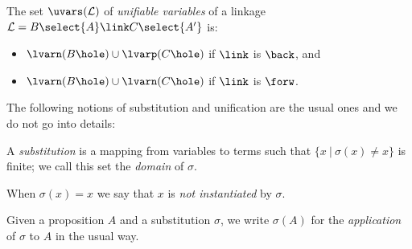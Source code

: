 \begin{definition}
\end{definition}


\begin{definition}\label{def:uvars}
  The set $\uvars(\mathcal{L})$ of {\em unifiable variables} of a linkage
  $\mathcal{L} = B\select{A}\link C\select{A'}$ is:
  \begin{itemize}
  \item $\lvarn(B\hole)\cup\lvarp(C\hole)$ if $\link$ is $\back$, and
  \item $\lvarn(B\hole)\cup\lvarn(C\hole)$ if $\link$ is $\forw$.
  \end{itemize}
\end{definition}

The following notions of substitution and unification are the usual ones and we
do not go into details:
 
\begin{definition}[Substitution]
  A \emph{substitution} is a mapping from variables to terms such that $\{x ~|~
  \sigma(x)\neq x\}$ is finite; we call this set the {\em domain} of $\sigma$.

  When $\sigma(x)=x$ we say that $x$ is  {\em not instantiated} by
  $\sigma$.
  
  
  Given a proposition $A$ and a substitution $\sigma$, we write
  $\sigma(A)$ for the \emph{application} of $\sigma$ to $A$ in the usual way.
\end{definition}

